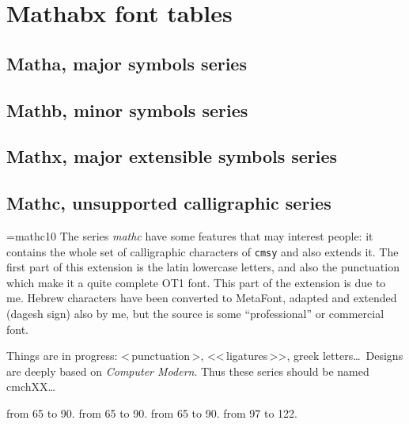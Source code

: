 \section{Mathabx font tables}

\subsection*{Matha, major symbols series}

{\def\fontname{matha10 }
\startfont\table}

\newpage

\subsection*{Mathb, minor symbols series}

{\def\fontname{mathb10 }
\startfont\table}

\newpage

\subsection*{Mathx, major extensible symbols series}
{\centerlargechars
\def\fontname{mathx10 }
\startfont\table}

\newpage

\subsection*{Mathc, unsupported calligraphic series}
{\font\unsupported=mathc10
\unsupported
The series\/ {\it mathc}\/ have some features that may interest
people: it contains the whole set of calligraphic characters
of\/ {\tt cmsy} and also extends it. The first part of this extension
is the latin lowercase letters, and also the punctuation which
make it a quite complete OT1 font. This part of the extension is due
to me. Hebrew characters have been converted to MetaFont,
adapted and extended (dagesh sign) also by me, but the source
is some ``professional'' or commercial font.

Things are in progress: <\,punctuation\,>, <<\,ligatures\,>>, greek letters\dots\
Designs are deeply based on {\it Computer Modern}.
Thus these series should be named
cmchXX\dots }

from 65 to 90.
from 65 to 90.
from 65 to 90.
\docomparison{mathc10 }{cmmi10}from 97 to 122.

